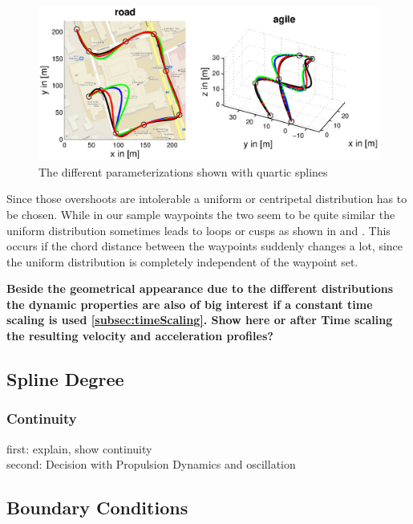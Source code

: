 \begin{figure}[H]
  \begin{minipage}[t]{0.9\textwidth}
    \includegraphics[width = \textwidth]{graphics/Parameterizations4_road_agile.eps}
  \end{minipage}
  \caption{The different parameterizations shown with quartic splines}
  \label{fig:parameterizations4_road_agile}
\end{figure}

Since those overshoots are intolerable a uniform or centripetal distribution has to be chosen. While in our sample waypoints the two seem to be quite similar the uniform distribution sometimes leads to  loops or cusps as shown in \cite{lee} and \cite{haron}. This occurs if the chord distance between the waypoints suddenly changes a lot, since the uniform distribution is completely independent of the waypoint set.

\textbf{Beside the geometrical appearance due to the different distributions the dynamic properties are also of big interest if a constant time scaling is used \ref{subsec:timeScaling}. Show here or after Time scaling the resulting velocity and acceleration profiles?}

\subsection{Spline Degree}
\subsubsection{Continuity}
first: explain, show continuity\\
second: Decision with Propulsion Dynamics and oscillation

\subsection{Boundary Conditions}

